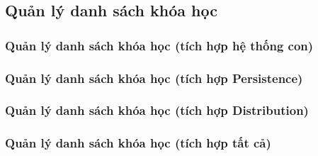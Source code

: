 \documentclass[./../main.tex]{subfiles}
\begin{document}
\subsection{Quản lý danh sách khóa học}
\subsubsection{Quản lý danh sách khóa học (tích hợp hệ thống con)}
\subsubsection{Quản lý danh sách khóa học (tích hợp Persistence)}
\subsubsection{Quản lý danh sách khóa học (tích hợp Distribution)}
\subsubsection{Quản lý danh sách khóa học (tích hợp tất cả)}
\end{document}
